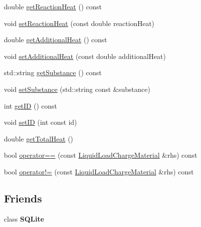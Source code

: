 \begin{DoxyCompactItemize}
\item 
double \hyperlink{class_liquid_load_charge_material_a2f0c26e789e98efd1e8fd0c8741ddd92}{get\+Reaction\+Heat} () const
\item 
void \hyperlink{class_liquid_load_charge_material_a793c7ebc2643b2af0eaf21b9cb788775}{set\+Reaction\+Heat} (const double reaction\+Heat)
\item 
double \hyperlink{class_liquid_load_charge_material_a6b79cd1aec59a7f7119a8abfa9e5859b}{get\+Additional\+Heat} () const
\item 
void \hyperlink{class_liquid_load_charge_material_a557c1f588cfb972ff0c7f748d6c2bd8f}{set\+Additional\+Heat} (const double additional\+Heat)
\item 
std\+::string \hyperlink{class_liquid_load_charge_material_a8f925c04c15ed889ba3fd7c4b628dbff}{get\+Substance} () const
\item 
void \hyperlink{class_liquid_load_charge_material_a85bb43270c6a11a1eaf51f00da16746a}{set\+Substance} (std\+::string const \&substance)
\item 
int \hyperlink{class_liquid_load_charge_material_a92591f91c6ed9fdda10733a439e86389}{get\+ID} () const
\item 
void \hyperlink{class_liquid_load_charge_material_a192946f14996795396354f3e15b9e30b}{set\+ID} (int const id)
\item 
double \hyperlink{class_liquid_load_charge_material_a51a9826325e2c34cd073b8766331d476}{get\+Total\+Heat} ()
\item 
bool \hyperlink{class_liquid_load_charge_material_ad2090d1628f26e46339e9e164b47d3a2}{operator==} (const \hyperlink{class_liquid_load_charge_material}{Liquid\+Load\+Charge\+Material} \&rhs) const
\item 
bool \hyperlink{class_liquid_load_charge_material_aa6ad825ee8ab1c7816ce3bf10260c0bb}{operator!=} (const \hyperlink{class_liquid_load_charge_material}{Liquid\+Load\+Charge\+Material} \&rhs) const
\end{DoxyCompactItemize}
\subsection*{Friends}
\begin{DoxyCompactItemize}
\item 
\mbox{\label{class_liquid_load_charge_material_ac7d22f3ca36435f73d55df60dc799e14}} 
class {\bfseries S\+Q\+Lite}
\end{DoxyCompactItemize}


